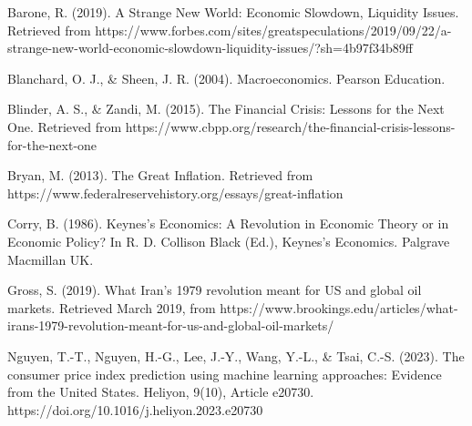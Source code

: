\documentclass[
  man,floatsintext,
  man]{apa6}
\begin{document}
\begin{hangparas}{4em}{1}
\noindent Barone, R. (2019). A Strange New World: Economic Slowdown, Liquidity Issues. Retrieved from https://www.forbes.com/sites/greatspeculations/2019/09/22/a-strange-new-world-economic-slowdown-liquidity-issues/?sh=4b97f34b89ff \newline
\end{hangparas}

\begin{hangparas}{4em}{1}
\noindent Blanchard, O. J., \& Sheen, J. R. (2004). Macroeconomics. Pearson Education.\newline
\end{hangparas}

\begin{hangparas}{4em}{1}
\noindent Blinder, A. S., \& Zandi, M. (2015). The Financial Crisis: Lessons for the Next One. Retrieved from https://www.cbpp.org/research/the-financial-crisis-lessons-for-the-next-one \newline
\end{hangparas}

\begin{hangparas}{4em}{1}
\noindent Bryan, M. (2013). The Great Inflation. Retrieved from https://www.federalreservehistory.org/essays/great-inflation \newline
\end{hangparas}

\begin{hangparas}{4em}{1}
\noindent Corry, B. (1986). Keynes's Economics: A Revolution in Economic Theory or in Economic Policy? In R. D. Collison Black (Ed.), Keynes's Economics. Palgrave Macmillan UK.\newline
\end{hangparas}

\begin{hangparas}{4em}{1}
\noindent Gross, S. (2019). What Iran's 1979 revolution meant for US and global oil markets. Retrieved March 2019, from https://www.brookings.edu/articles/what-irans-1979-revolution-meant-for-us-and-global-oil-markets/ \newline
\end{hangparas}

\begin{hangparas}{4em}{1}
\noindent Nguyen, T.-T., Nguyen, H.-G., Lee, J.-Y., Wang, Y.-L., \& Tsai, C.-S. (2023). The consumer price index prediction using machine learning approaches: Evidence from the United States. Heliyon, 9(10), Article e20730. https://doi.org/10.1016/j.heliyon.2023.e20730 \newline
\end{hangparas}
\end{document}
